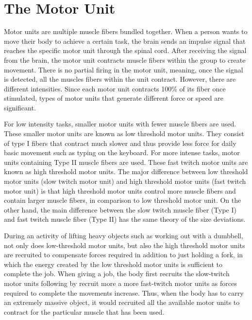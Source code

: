 \hypertarget{the-motor-unit}{%
\section{The Motor Unit}\label{the-motor-unit}}

Motor units are multiple muscle fibers bundled together. When a person wants to move their body to achieve a certain task, the brain sends an impulse signal that reaches the specific motor unit through the spinal cord. After receiving the signal from the brain, the motor unit contracts muscle fibers within the group to create movement. There is no partial firing in the motor unit, meaning, once the signal is detected, all the muscles fibers within the unit contract. However, there are different intensities. Since each motor unit contracts 100\% of its fiber once stimulated, types of motor units that generate different force or speed are significant.

For low intensity tasks, smaller motor units with fewer muscle fibers are used. These smaller motor units are known as low threshold motor units. They consist of type I fibers that contract much slower and thus provide less force for daily basic movement such as typing on the keyboard. For more intense tasks, motor units containing Type II muscle fibers are used. These fast twitch motor units are known as high threshold motor units. The major difference between low threshold motor units (slow twitch motor unit) and high threshold motor units (fast twitch motor unit) is that high threshold motor units control more muscle fibers and contain larger muscle fibers, in comparison to low threshold motor unit. On the other hand, the main difference between the slow twitch muscle fiber (Type I) and fast twitch muscle fiber (Type II) has the same theory of the size deviations.

During an activity of lifting heavy objects such as working out with a dumbbell, not only does low-threshold motor units, but also the high threshold motor units are recruited to compensate forces required in addition to just holding a fork, in which the energy created by the low threshold motor units is sufficient to complete the job. When giving a job, the body first recruits the slow-twitch motor units following by recruit more a more fast-twitch motor units as forces required to complete the movements increase. Thus, when the body has to carry an extremely massive object, it would recruited all the available motor units to contract for the particular muscle that has been used.


